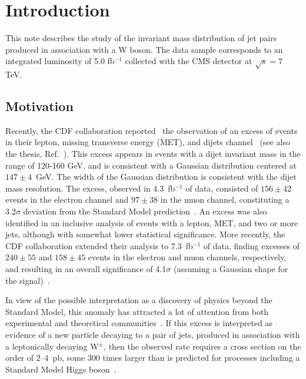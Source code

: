 \section{Introduction}
\label{sec:introduction}
This note describes the study of  
the invariant mass distribution of jet pairs produced in association 
with a W boson.
The data sample corresponds to an integrated 
luminosity of 5.0 fb${}^{-1}$ collected with the CMS detector at 
$\sqrt{s} = 7$ TeV.

\subsection{Motivation}
\label{sec:motivation}
Recently, the CDF collaboration reported~\cite{cdf_paper} 
the observation of an excess 
of events in  their lepton, missing transverse energy (MET), 
and dijets channel~\cite{cdf_paper,cdf_web} 
(see also the thesis, Ref.~\cite{Cavalierethesis}). 
This excess appears in events with a dijet invariant 
mass in the range of 120-160 GeV, and is consistent with a 
Gaussian distribution centered at $147\pm 4$~GeV. 
The width of the Gaussian distribution is consistent with the dijet mass resolution. 
The excess, observed in 4.3~fb$^{-1}$ of data, consisted of $156\pm42$ events in the electron 
channel and $97\pm38$ in the muon channel, constituting 
a 3.2$\sigma$ deviation from the Standard 
Model prediction~\cite{cdf_paper}. 
An excess was also identified in an inclusive analysis 
of events with a lepton, MET, and two or more jets, 
although with somewhat lower statistical significance. 
More recently, the CDF collaboration extended their 
analysis to 7.3~fb$^{-1}$ of data, finding excesses of 
$240\pm55$ and $158 \pm 45$ events in the electron and 
muon channels, respectively, and resulting in an overall 
significance of 4.1$\sigma$ (assuming a Gaussian shape for 
the signal)~\cite{cdf_web}. 


\par
In view of the possible interpretation as a discovery of physics 
beyond the Standard Model, this anomaly has attracted a lot of attention 
from both experimental and theoretical communities~\cite{BuckleyHooperMartin}. 
If this excess is interpreted as evidence of a new particle 
decaying to a pair of jets, produced in association with a 
leptonically decaying W$^\pm$, then the observed rate requires a 
cross section on the order of $2$--$4$~pb, some 300 times larger 
than is predicted for processes including a Standard Model 
Higgs boson~\cite{BuckleyHooperMartin}.

